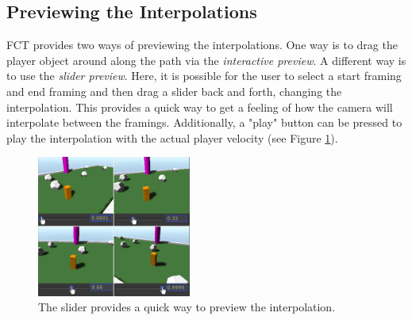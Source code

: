 \subsection{Previewing the Interpolations}
FCT provides two ways of previewing the interpolations. One way is to drag the player object around along the path via the \textit{interactive preview}. A different way is to use the \textit{slider preview}. Here, it is possible for the user to select a start framing and end framing and then drag a slider back and forth, changing the interpolation. This provides a quick way to get a feeling of how the camera will interpolate between the framings. Additionally, a "play" button can be pressed to play the interpolation with the actual player velocity (see Figure \ref{fig:slider}).




\begin{figure}[htbp]
\centering
\includegraphics[width=0.45\textwidth]{Pics/slider}
\caption{The slider provides a quick way to preview the interpolation.}
\label{fig:slider}
\end{figure}

